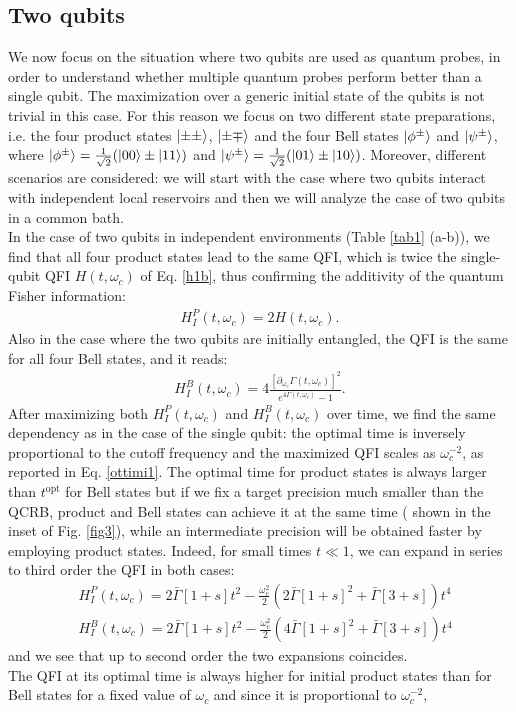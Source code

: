 \documentclass[ pra,a4paper,aps,twocolumn,superscriptaddress]{revtex4-1}
\def\ket#1{\mathinner{|{#1}\rangle}}
\def\tc#1{{\color{black}#1}}
\begin{document}
 \subsection{Two qubits}
 We now focus on the situation where two qubits are used as quantum probes, in order to understand whether multiple quantum probes perform better than a single qubit.
The maximization over a generic initial state of the qubits is not trivial in this case. For this reason we focus on two different state preparations, i.e. the four product states $\ket{\pm \pm}$, $\ket{\pm \mp}$ and the four Bell states $\ket{\phi^{\pm}}$ and $\ket{\psi^{\pm}}$, where $\ket{\phi^{\pm}}=\frac{1}{\sqrt{2}}(\ket{00}\pm\ket{11})$ and $ \ket{\psi^{\pm}}=\frac{1}{\sqrt{2}}(\ket{01}\pm\ket{10})$.
 Moreover, different scenarios are considered: we will start with the case where two qubits interact
 with independent local reservoirs and then we will analyze the case of two qubits in a common bath.
 \\
In the case of two qubits in independent environments (Table \ref{tab1} (a-b)), we find that all four product states lead to the same QFI, which is twice the single-qubit QFI $H(t,\omega_c)$ of Eq. \eqref{h1b}, thus confirming the additivity of the quantum Fisher information:
\begin{align}
H_I^P(t,\omega_c)=2 H(t,\omega_c).
\end{align}
Also in the case where the two qubits are initially entangled, the  QFI is the same for all four Bell states,
and it reads:
\begin{align}
H_I^B(t,\omega_c)=4\frac{[\partial_{\omega_c}\Gamma(t,\omega_c)]^2}{e^{4\Gamma(t,\omega_c)}-1}.
\end{align}
After maximizing both $H_I^P(t,\omega_c)$ and $H_I^B(t,\omega_c)$ over time, we find the same dependency as in the case of the single qubit: the optimal time is inversely proportional to the cutoff frequency and the maximized QFI scales as $\omega_c^{-2}$, as reported in Eq. \eqref{ottimi1}.
 \tc{The optimal time for product states is always  larger than $t^{\text{opt}}$ for Bell states  but 
if we fix a target precision much smaller than the QCRB, product  and Bell states can achieve it at the same time (
shown in the inset of Fig. \ref{fig3}), while an intermediate precision will be obtained faster by employing product states.
Indeed, for small times $t\ll1$, we can expand in series to third order the QFI in both cases:\begin{align}
&H_I^P\!(t,\omega_c)\!=\!2\bar{\Gamma}[1\!+\!s]t^2\!-\!\frac{\omega_c^2}{2}\!\left(2\bar{\Gamma}[1\!+\!s]^2\!+\bar{\Gamma}[3\!+\!s]\right)\!t^4\\
&H_I^B(t,\omega_c)\!=\!2\bar{\Gamma}[1\!+\!s]t^2\!-\!\frac{\omega_c^2}{2}\!\left(4\bar{\Gamma}[1\!+\!s]^2\!+\bar{\Gamma}[3\!+\!s]\right)\!t^4
\end{align}
and we see that up to second order the two expansions coincides.\\
 The QFI at its optimal time is always higher for initial product states than for Bell states for a fixed value of $\omega_c$ and since it
 is proportional to $\omega_c^{-2}$,
 }
\end{document}
